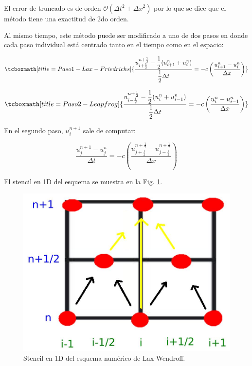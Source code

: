 \documentclass[12pt,dvipsnames]{exam}
\begin{document}
El error de truncado es de orden $\mathcal{O}({\Delta t}^{2} + {\Delta x}^{2})$ por lo que se dice que el método tiene una exactitud de 2do orden.

Al mismo tiempo, este método puede ser modificado a uno de dos pasos en donde cada paso individual está centrado tanto en el tiempo como en el espacio:

\begin{equation*}
\tcboxmath[title=Paso 1 - Lax-Friedrichs]{\dfrac{u_{i+\frac{1}{2}}^{n+\frac{1}{2}}-\dfrac{1}{2}(u_{i+1}^n+u_{i}^n)}{\dfrac{1}{2}\Delta t}=-c\left(\dfrac{u_{i+1}^n-u_{i}^n}{\Delta x}\right)}
\end{equation*}

\begin{equation*}
\tcboxmath[title=Paso 2 - Leapfrog]{\dfrac{u_{i-\frac{1}{2}}^{n+\frac{1}{2}}-\dfrac{1}{2}(u_{i}^n+u_{i-1}^n)}{\dfrac{1}{2}\Delta t}=-c\left(\dfrac{u_{i}^n-u_{i-1}^n}{\Delta x}\right)}
\end{equation*}

En el segundo paso, $u_{i}^{n+1}$ sale de computar:

\begin{equation*}
    \dfrac{u_{j}^{n+1}-u_{j}^{n}}{\Delta t}=-c\left(\dfrac{u_{j+\frac{1}{2}}^{n+\frac{1}{2}}-u_{j-\frac{1}{2}}^{n+\frac{1}{2}}}{\Delta x}\right)
\end{equation*}

El stencil en 1D del esquema se muestra en la Fig. \ref{lwaf}.

\begin{figure}[H]
\centering
\includegraphics[scale=0.7]{lwa.jpeg}
\caption{Stencil en 1D del esquema numérico de Lax-Wendroff.} \label{lwaf}
\end{figure}
\end{document}
